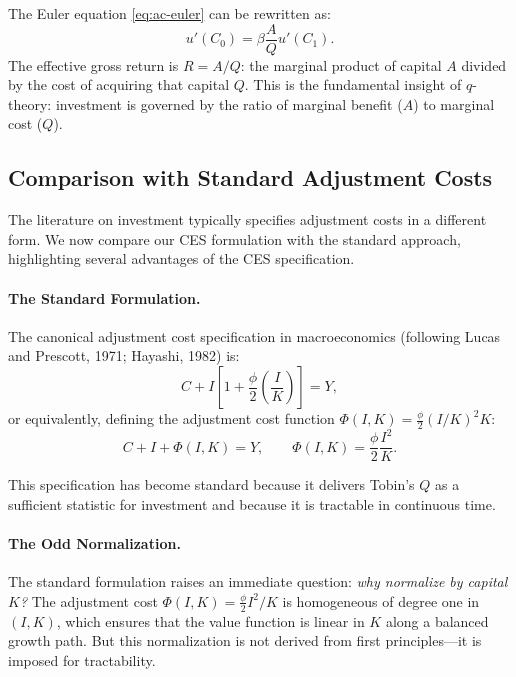 \begin{calloutnote}
The Euler equation \cref{eq:ac-euler} can be rewritten as:
\begin{equation}
u'(C_0) = \beta \frac{A}{Q} u'(C_1).
\label{eq:ac-euler-Q}
\end{equation}
The effective gross return is $R = A/Q$: the marginal product of capital $A$ divided by the cost of acquiring that capital $Q$. This is the fundamental insight of $q$-theory: investment is governed by the ratio of marginal benefit ($A$) to marginal cost ($Q$).
\end{calloutnote}

\subsection{Comparison with Standard Adjustment Costs}
\label{subsec:ac-comparison}

The literature on investment typically specifies adjustment costs in a different form. We now compare our CES formulation with the standard approach, highlighting several advantages of the CES specification.

\paragraph{The Standard Formulation.}
The canonical adjustment cost specification in macroeconomics (following Lucas and Prescott, 1971; Hayashi, 1982) is:
\begin{equation}
C + I \left[ 1 + \frac{\phi}{2} \left( \frac{I}{K} \right) \right] = Y,
\label{eq:ac-standard}
\end{equation}
or equivalently, defining the adjustment cost function $\Phi(I, K) = \frac{\phi}{2} (I/K)^2 K$:
\begin{equation}
C + I + \Phi(I, K) = Y, \qquad \Phi(I, K) = \frac{\phi}{2} \frac{I^2}{K}.
\label{eq:ac-standard-phi}
\end{equation}

This specification has become standard because it delivers Tobin's $Q$ as a sufficient statistic for investment and because it is tractable in continuous time.

\paragraph{The Odd Normalization.}
The standard formulation raises an immediate question: \emph{why normalize by capital $K$?} The adjustment cost $\Phi(I, K) = \frac{\phi}{2} I^2 / K$ is homogeneous of degree one in $(I, K)$, which ensures that the value function is linear in $K$ along a balanced growth path. But this normalization is not derived from first principles---it is imposed for tractability.

